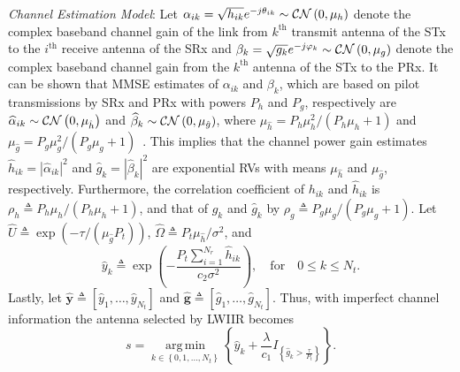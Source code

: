 \documentclass[12pt,draftcls,peerreview,onecolumn]{IEEEtran}
\newcommand{\cbrac}[1]{\left\{{#1}\right\}}
\newcommand{\indic}[1]{I_{\cbrac{#1}}}
\newcommand{\CN}{{\cal CN}}
\newcommand{\define}{\triangleq}
\DeclareMathOperator*{\argmin}{arg\,min}
\newcommand{\nx}{{0}}
\newcommand{\lam}{\lambda}
\newcommand{\lamstar}{\lam^{*}}
\newcommand{\mug}{{\mu_{g}}}
\newcommand{\muh}{{\mu_{h}}}
\newcommand{\Nt}{{N_t}}
\newcommand{\Nr}{{N_r}}
\newcommand{\Pt}{{P_t}}
\newcommand{\such}{h}
\newcommand{\puch}{g}
\newcommand{\hk}[1]{{\such_{#1}}}
\newcommand{\gk}[1]{{\puch_{#1}}}
\newcommand{\ghatvec}{\mathbf{\hat{\puch}}}
\newcommand{\yhatvec}{\mathbf{\hat{y}}}
\newcommand{\noisevar}{\sigma^2}
\newcommand{\outmax}{O_{\text{max}}}
\newcommand{\itau}{\tau}
\newcommand{\cone}{c_{1}}
\newcommand{\ctwo}{c_{2}}
\newcommand{\out}{O}
\newcommand{\m}{\cone}
\newcommand{\taubypt}{\frac{\itau}{\Pt}}
\newcommand{\gkhatgrtaubypt}[1]{{\gkhat{#1}}>\taubypt}
\newcommand{\ghatindic}[1]{\indic{\gkhatgrtaubypt{#1}}}
\newcommand{\lambym}{\frac{\lam}{\m}}
\newcommand{\lamstarbym}{\frac{\lamstar}{\m}}
\newcommand{\ykhatplusgkhat}[1]{ \ykhat{#1} + \lambym\ghatindic{#1}}
\newcommand{\al}{\ctwo}
\newcommand{\snr}{\Omega}
\newcommand{\albysnr}[1][]{\frac{\al#1}{\snr}}
\newcommand{\un}{U}
\newcommand{\allopts}{\left\{\nx,1,\ldots,\Nt\right\}}
\newcommand{\suchph}{\theta}
\newcommand{\puchph}{\varphi}
\newcommand{\ith}{i^{\text{th}}}
\newcommand{\kth}{k^{\text{th}}}
\newcommand{\outlam}{\out_{\lam}}
\newcommand{\sug}{\alpha}
\newcommand{\pug}{\beta}
\newcommand{\sugain}[1]{\sug_{#1}}
\newcommand{\pugain}[1]{\pug_{#1}}
\newcommand{\sugainhat}[1]{\widehat{\sug}_{#1}}
\newcommand{\pugainhat}[1]{\widehat{\pug}_{#1}}
\newcommand{\unhat}{\widehat{\un}}
\newcommand{\snrhat}{\widehat{\snr}}
\newcommand{\gpilotpower}{P_g}
\newcommand{\hpilotpower}{P_h}
\newcommand{\hhat}{\hat{\such}}
\newcommand{\ghat}{\hat{\puch}}
\newcommand{\yhat}{\hat{y}}
\newcommand{\hkhat}[1]{\hhat_{#1}}
\newcommand{\gkhat}[1]{\ghat_{#1}}
\newcommand{\ykhat}[1]{\hat{y}_{#1}}
\newcommand{\muhhat}{\mu_{\hhat}}
\newcommand{\mughat}{\mu_{\ghat}}
\newcommand{\ccdfghatinline}{\exp\left( {-{\itau}/{\left( \mughat\Pt\right) }}\right) }
\newcommand{\rhog}{\rho_g}
\newcommand{\rhoh}{\rho_h}
\newcommand{\ccdfyhatrv}[1]{F^{c}_{\yhat}\left(#1 \right) }
\begin{document}
{\em Channel Estimation Model}: Let $\sugain{ik} = \sqrt{\hk{ik}}e^{-j\suchph_{ik}}\sim\CN\left(0,\muh\right) $ denote the complex baseband channel gain of the link from $\kth$ transmit antenna of the STx to the $\ith$ receive antenna of the SRx and $\pugain{k} = \sqrt{\gk{k}}e^{-j\puchph_{k}}\sim\CN\left(0,\mug\right)$ denote the complex baseband channel gain from the $\kth$ antenna of the STx to the PRx.  It can be shown that MMSE estimates of $\sugain{ik}$ and $\pugain{k}$, which are based on pilot transmissions by SRx and PRx with powers $\hpilotpower$ and $\gpilotpower$, respectively are  $\sugainhat{ik}\sim\CN\left(0, \muhhat \right)$ and $\pugainhat{k}\sim \CN\left(0, \mughat\right) $, where  $\muhhat ={\hpilotpower\mu^2_{\such}}/{\left( \hpilotpower\muh+1\right)}$ and $\mughat = {\gpilotpower\mu^2_{\puch}}/{\left( \gpilotpower\mug+1\right)}$~\cite{Kashyap_2014_TCOM}.  
This implies that the channel power gain estimates $\hkhat{ik}=|\sugainhat{ik}|^2$ and $\gkhat{k}=|\pugainhat{k}|^2$ are exponential RVs with means $\muhhat$ and $\mughat$, respectively. Furthermore, the correlation coefficient  of $\hk{ik}$ and $\hkhat{ik}$ is $\rhoh\define{\hpilotpower\muh}/{\left( \hpilotpower\muh + 1\right) }$, and that of $\gk{k}$ and $\gkhat{k}$ by $\rhog \define{\gpilotpower\mug}/{\left( \gpilotpower\mug + 1\right) }$. Let  $\unhat\define\ccdfghatinline$,  $\snrhat\define{\Pt\muhhat}/{\noisevar}$, and 
\begin{equation}
\ykhat{k} \define  \exp\left({- \frac{\Pt\sum_{i=1}^{\Nr}\hkhat{ik}}{\ctwo\noisevar} }\right), \quad \text{for} \quad 0\leq k \leq\Nt.
\label{eq:yihat_def}
\end{equation}
Lastly, let $\yhatvec\define\left[\ykhat{1},\ldots,\ykhat{\Nt} \right]$ and $\ghatvec\define\left[\gkhat{1},\ldots,\gkhat{\Nt} \right]$.
Thus, with imperfect channel information the antenna selected by LWIIR becomes 
\begin{equation}
s=\argmin\limits_{k\in\allopts} \left\{ \ykhatplusgkhat{k} \right\}.
\label{eq:shat}
\end{equation}

\newcommand{\D}{D}
\newcommand{\pdfyhatNr}{\left(\ln\left(\frac{1}{x}\right)\right)^{\Nr-1}x^{\albysnr[]-1}} %
\newcommand{\yhattimespdfyNr}{\left(-\ln\left(x\right)\right)^{\Nr-1}x^{\D}} %
\newcommand{\yhatpluslamstartimespdfyNr}{\left(-\ln\left({x+\lamstarbym}\right)\right)^{\Nr-1}\left(x+\lamstarbym\right)^{\D}} %
\newcommand{\yhatpluslamtimespdfyNr}{\left(-\ln\left({x+\lambym}\right)\right)^{\Nr-1}\left(x+\lambym\right)^{\D}} %
\newcommand{\unccdfyhat}[2]{{#1}\,\,\ccdfyhatrv{#2}}
\end{document}
